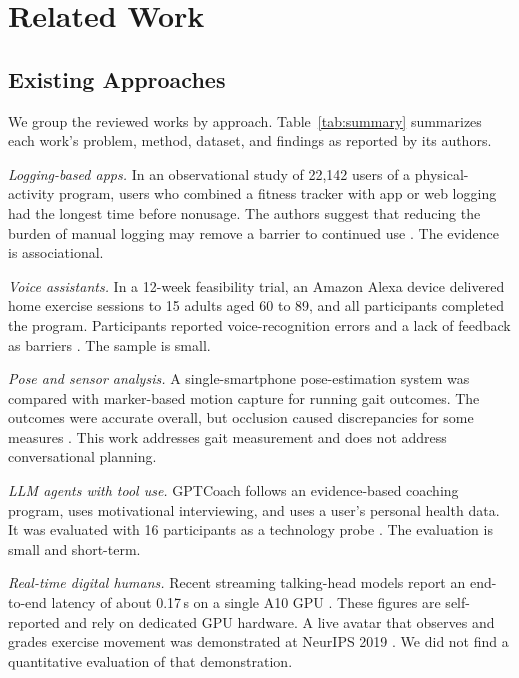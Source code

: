 \section{Related Work}\label{sec:related}
\subsection{Existing Approaches}
We group the reviewed works by approach. Table~\ref{tab:summary} summarizes each work's problem, method, dataset, and findings as reported by its authors.

\textit{Logging-based apps.} In an observational study of 22,142 users of a physical-activity program, users who combined a fitness tracker with app or web logging had the longest time before nonusage. The authors suggest that reducing the burden of manual logging may remove a barrier to continued use \cite{rayward2021}. The evidence is associational.

\textit{Voice assistants.} In a 12-week feasibility trial, an Amazon Alexa device delivered home exercise sessions to 15 adults aged 60 to 89, and all participants completed the program. Participants reported voice-recognition errors and a lack of feedback as barriers \cite{jansons2022}. The sample is small.

\textit{Pose and sensor analysis.} A single-smartphone pose-estimation system was compared with marker-based motion capture for running gait outcomes. The outcomes were accurate overall, but occlusion caused discrepancies for some measures \cite{young2023}. This work addresses gait measurement and does not address conversational planning.

\textit{LLM agents with tool use.} GPTCoach follows an evidence-based coaching program, uses motivational interviewing, and uses a user's personal health data. It was evaluated with 16 participants as a technology probe \cite{jorke2024}. The evaluation is small and short-term.

\textit{Real-time digital humans.} Recent streaming talking-head models report an end-to-end latency of about 0.17\,s on a single A10 GPU \cite{liu2025livatar}. These figures are self-reported and rely on dedicated GPU hardware. A live avatar that observes and grades exercise movement was demonstrated at NeurIPS 2019 \cite{memisevic2019millie}. We did not find a quantitative evaluation of that demonstration.

